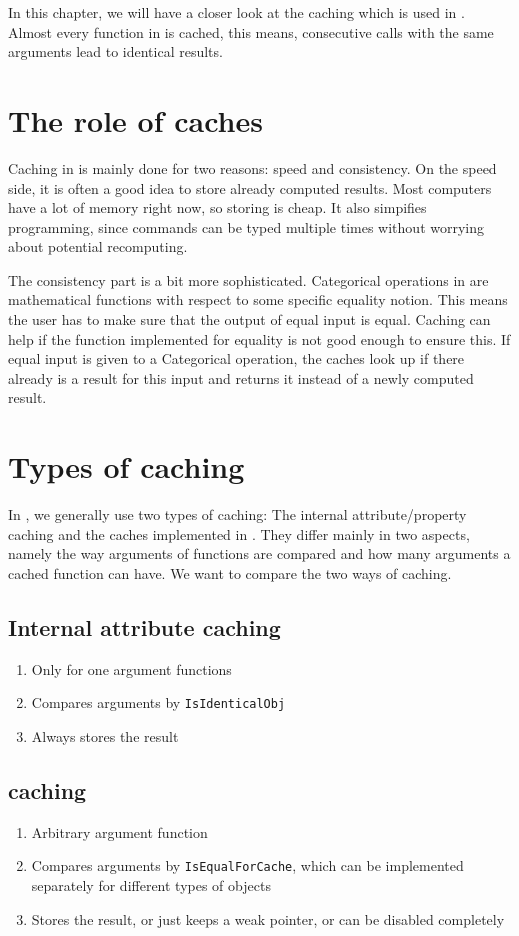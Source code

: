 In this chapter, we will have a closer look at the caching
which is used in \CapPkg. Almost every function in \CapPkg is cached,
this means, consecutive calls with the same arguments lead to identical results.

\section{The role of caches}

Caching in \CapPkg is mainly done for two reasons: speed and consistency. On the speed side, it is often
a good idea to store already computed results. Most computers have a lot of memory right now, so storing is
cheap. It also simpifies programming, since commands can be typed multiple times without worrying about potential
recomputing.

The consistency part is a bit more sophisticated. Categorical operations in \CapPkg are mathematical functions
with respect to some specific equality notion. This means the user has to make sure that the output
of equal input is equal. Caching can help if the function implemented for equality is not good enough
to ensure this. If equal input is given to a Categorical operation, the caches look up if there already
is a result for this input and returns it instead of a newly computed result.

\section{Types of caching}

In \CapPkg, we generally use two types of caching: The \GAP internal attribute/property caching and
the caches implemented in \CapPkg. They differ mainly in two aspects, namely the way arguments of
functions are compared and how many arguments a cached function can have. We want to compare the two
ways of caching.

\subsection{Internal attribute caching}
\begin{enumerate}
 \item Only for one argument functions
 \item Compares arguments by \texttt{IsIdenticalObj}
 \item Always stores the result
\end{enumerate}

\subsection{\CapPkg caching}
\begin{enumerate}
 \item Arbitrary argument function
 \item Compares arguments by \texttt{IsEqualForCache}, which can be implemented separately for different types of objects
 \item Stores the result, or just keeps a weak pointer, or can be disabled completely
\end{enumerate}

